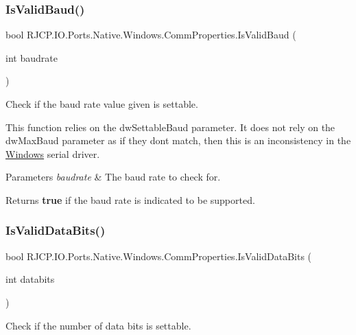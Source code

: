 \subsubsection{\texorpdfstring{IsValidBaud()}{IsValidBaud()}}
{\footnotesize\ttfamily bool R\+J\+C\+P.\+I\+O.\+Ports.\+Native.\+Windows.\+Comm\+Properties.\+Is\+Valid\+Baud (\begin{DoxyParamCaption}\item[{int}]{baudrate }\end{DoxyParamCaption})}



Check if the baud rate value given is settable. 

This function relies on the {\ttfamily dw\+Settable\+Baud} parameter. It does not rely on the {\ttfamily dw\+Max\+Baud} parameter as if they don\textquotesingle{}t match, then this is an inconsistency in the \mbox{\hyperlink{namespace_r_j_c_p_1_1_i_o_1_1_ports_1_1_native_1_1_windows}{Windows}} serial driver. 


\begin{DoxyParams}{Parameters}
{\em baudrate} & The baud rate to check for.\\
\hline
\end{DoxyParams}
\begin{DoxyReturn}{Returns}
{\bfseries{true}} if the baud rate is indicated to be supported.
\end{DoxyReturn}
\mbox{\label{class_r_j_c_p_1_1_i_o_1_1_ports_1_1_native_1_1_windows_1_1_comm_properties_a25fa4b8cd5c49959427e1f04a236b518}} 
\subsubsection{\texorpdfstring{IsValidDataBits()}{IsValidDataBits()}}
{\footnotesize\ttfamily bool R\+J\+C\+P.\+I\+O.\+Ports.\+Native.\+Windows.\+Comm\+Properties.\+Is\+Valid\+Data\+Bits (\begin{DoxyParamCaption}\item[{int}]{databits }\end{DoxyParamCaption})}



Check if the number of data bits is settable. 


